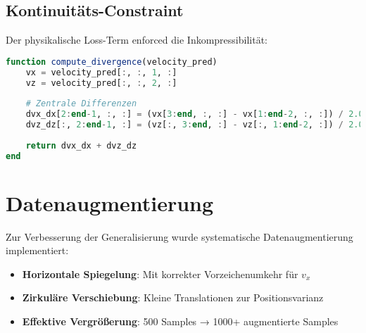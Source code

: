 \subsection{Kontinuitäts-Constraint}

Der physikalische Loss-Term enforced die Inkompressibilität:

\begin{lstlisting}[language=Julia, caption={GPU-kompatible Divergenz-Berechnung}]
function compute_divergence(velocity_pred)
    vx = velocity_pred[:, :, 1, :]
    vz = velocity_pred[:, :, 2, :]
    
    # Zentrale Differenzen
    dvx_dx[2:end-1, :, :] = (vx[3:end, :, :] - vx[1:end-2, :, :]) / 2.0
    dvz_dz[:, 2:end-1, :] = (vz[:, 3:end, :] - vz[:, 1:end-2, :]) / 2.0
    
    return dvx_dx + dvz_dz
end
\end{lstlisting}

\section{Datenaugmentierung}

Zur Verbesserung der Generalisierung wurde systematische Datenaugmentierung implementiert:

\begin{itemize}
    \item \textbf{Horizontale Spiegelung}: Mit korrekter Vorzeichenumkehr für $v_x$
    \item \textbf{Zirkuläre Verschiebung}: Kleine Translationen zur Positionsvarianz
    \item \textbf{Effektive Vergrößerung}: 500 Samples → 1000+ augmentierte Samples
\end{itemize}